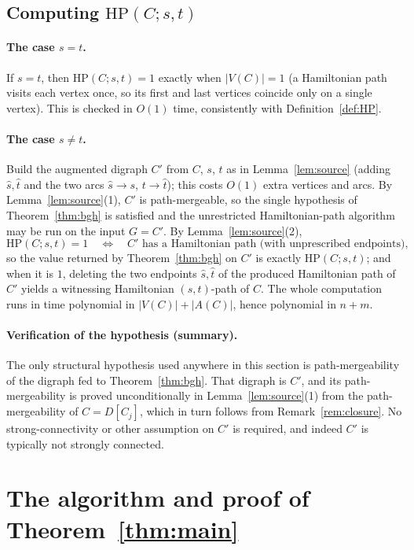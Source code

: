 \documentclass[12pt]{article}
\theoremstyle{definition}
\begin{document}
\subsection{Computing \texorpdfstring{$\mathrm{HP}(C;s,t)$}{HP(C;s,t)}}

\paragraph{The case $s=t$.}
If $s=t$, then $\mathrm{HP}(C;s,t)=1$ exactly when $|V(C)|=1$ (a Hamiltonian path
visits each vertex once, so its first and last vertices coincide only on a single
vertex). This is checked in $O(1)$ time, consistently with
Definition~\ref{def:HP}.

\paragraph{The case $s\neq t$.}
Build the augmented digraph $C'$ from $C$, $s$, $t$ as in Lemma~\ref{lem:source}
(adding $\hat s,\hat t$ and the two arcs $\hat s\to s$, $t\to\hat t$); this costs
$O(1)$ extra vertices and arcs. By Lemma~\ref{lem:source}(1), $C'$ is
path-mergeable, so the single hypothesis of Theorem~\ref{thm:bgh} is satisfied and
the unrestricted Hamiltonian-path algorithm may be run on the input $G=C'$. By
Lemma~\ref{lem:source}(2),
\[
\mathrm{HP}(C;s,t)=1
\quad\Longleftrightarrow\quad
C'\text{ has a Hamiltonian path (with unprescribed endpoints),}
\]
so the value returned by Theorem~\ref{thm:bgh} on $C'$ is exactly
$\mathrm{HP}(C;s,t)$; and when it is $1$, deleting the two endpoints $\hat s,\hat t$
of the produced Hamiltonian path of $C'$ yields a witnessing Hamiltonian
$(s,t)$-path of $C$. The whole computation runs in time polynomial in
$|V(C)|+|A(C)|$, hence polynomial in $n+m$.

\paragraph{Verification of the hypothesis (summary).}
The only structural hypothesis used anywhere in this section is path-mergeability
of the digraph fed to Theorem~\ref{thm:bgh}. That digraph is $C'$, and its
path-mergeability is proved unconditionally in Lemma~\ref{lem:source}(1) from the
path-mergeability of $C=D[C_{j}]$, which in turn follows from
Remark~\ref{rem:closure}. No strong-connectivity or other assumption on $C'$ is
required, and indeed $C'$ is typically not strongly connected.

\section{The algorithm and proof of Theorem~\ref{thm:main}}
\end{document}
